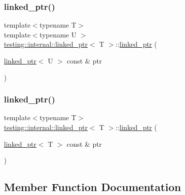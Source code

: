 \subsubsection{\texorpdfstring{linked\_ptr()}{linked\_ptr()}\hspace{0.1cm}{\footnotesize\ttfamily [2/3]}}
{\footnotesize\ttfamily template$<$typename T$>$ \\
template$<$typename U $>$ \\
\mbox{\hyperlink{classtesting_1_1internal_1_1linked__ptr}{testing\+::internal\+::linked\+\_\+ptr}}$<$ T $>$\+::\mbox{\hyperlink{classtesting_1_1internal_1_1linked__ptr}{linked\+\_\+ptr}} (\begin{DoxyParamCaption}\item[{\mbox{\hyperlink{classtesting_1_1internal_1_1linked__ptr}{linked\+\_\+ptr}}$<$ U $>$ const \&}]{ptr }\end{DoxyParamCaption})\hspace{0.3cm}{\ttfamily [inline]}}

\mbox{\label{classtesting_1_1internal_1_1linked__ptr_abc076b5678cc7f64306d5ecfefc93aff}} 
\subsubsection{\texorpdfstring{linked\_ptr()}{linked\_ptr()}\hspace{0.1cm}{\footnotesize\ttfamily [3/3]}}
{\footnotesize\ttfamily template$<$typename T$>$ \\
\mbox{\hyperlink{classtesting_1_1internal_1_1linked__ptr}{testing\+::internal\+::linked\+\_\+ptr}}$<$ T $>$\+::\mbox{\hyperlink{classtesting_1_1internal_1_1linked__ptr}{linked\+\_\+ptr}} (\begin{DoxyParamCaption}\item[{\mbox{\hyperlink{classtesting_1_1internal_1_1linked__ptr}{linked\+\_\+ptr}}$<$ T $>$ const \&}]{ptr }\end{DoxyParamCaption})\hspace{0.3cm}{\ttfamily [inline]}}



\subsection{Member Function Documentation}
\mbox{\label{classtesting_1_1internal_1_1linked__ptr_a0b4623795339fd29bf9303f926ae2824}} 
